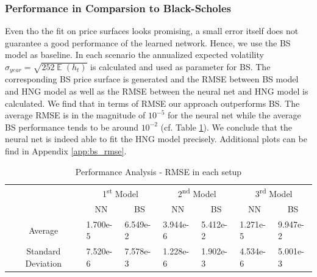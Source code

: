 \documentclass{article}
\DeclareMathOperator{\E}{\mathbb{E}}
\newcommand{\ts}{\textsuperscript}
\begin{document}
\subsubsection{Performance in Comparsion to Black-Scholes}\label{sec:bs_results}
Even tho the fit on price surfaces looks promising, a small error itself does not guarantee a good performance of the learned network. Hence, we use the BS model as baseline. In each scenario the annualized expected volatility $\sigma_{year}=\sqrt{252\E(h_t)}$ is calculated and used as parameter for BS. The corresponding BS price surface is generated and the RMSE between BS model and HNG model as well as the RMSE between the neural net and HNG model is calculated. We find that in terms of RMSE our approach outperforms BS. The average RMSE is in the magnitude of $10^{-5}$ for the neural net while the average BS performance tends to be around $10^{-2}$ (cf. Table \ref{tab:bs_rmse}). We conclude that the neural net is indeed able to fit the HNG model precisely. Additional plots can be find in Appendix \ref{app:bs_rmse}.
\begin{table}[!ht]
\centering
\begin{tabular}{|l|l|l|l|l|l|l|}
\hline
\multirow{2}{*}{} & \multicolumn{2}{c|}{1\ts{st} Model \footnotemark} & \multicolumn{2}{c|}{2\ts{nd} Model \footnotemark} & \multicolumn{2}{c|}{3\ts{rd} Model \footnotemark} \\ \cline{2-7} 
 & \multicolumn{1}{c|}{NN} & \multicolumn{1}{c|}{BS} & \multicolumn{1}{c|}{NN} & \multicolumn{1}{c|}{BS} & \multicolumn{1}{c|}{NN} & \multicolumn{1}{c|}{BS} \\ \hline
\multicolumn{1}{|c|}{Average} & 1.700e-5 & 6.549e-2 & 3.944e-6 & 5.412e-2 & 1.271e-5 & 9.947e-2 \\ \hline
\multicolumn{1}{|c|}{Standard Deviation} & 7.520e-6 & 7.578e-3 & 1.228e-6 & 1.902e-3 & 4.534e-6 & 5.001e-3 \\ \hline
\end{tabular}\vspace{0.1cm}
\caption{Performance Analysis - RMSE in each setup\label{tab:bs_rmse}}
\end{table}
\end{document}
